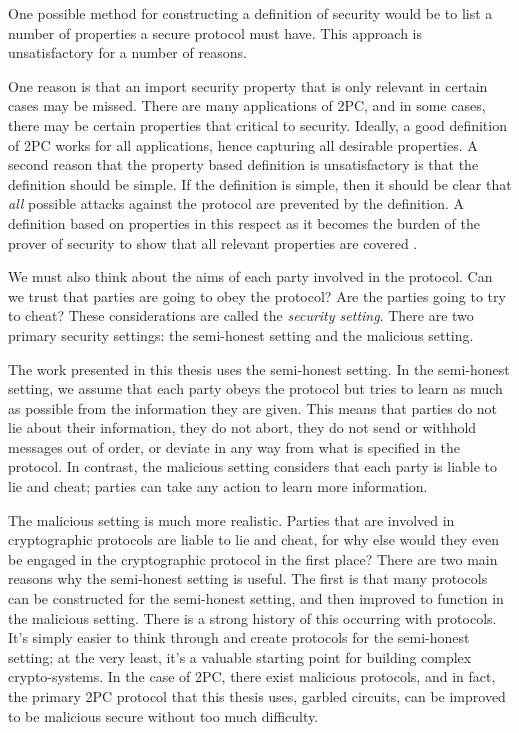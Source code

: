 One possible method for constructing a definition of security would be to list a number of properties a secure protocol must have.
This approach is unsatisfactory for a number of reasons.

One reason is that an import security property that is only relevant in certain cases may be missed.
There are many applications of 2PC, and in some cases, there may be certain properties that critical to security.
Ideally, a good definition of 2PC works for all applications, hence capturing all desirable properties.
A second reason that the property based definition is unsatisfactory is that the definition should be simple.
If the definition is simple, then it should be clear that \textit{all} possible attacks against the protocol are prevented by the definition.
A definition based on properties in this respect as it becomes the burden of the prover of security to show that all relevant properties are covered \cite{lindell2009}.

We must also think about the aims of each party involved in the protocol. 
Can we trust that parties are going to obey the protocol? 
Are the parties going to try to cheat?
These considerations are called the \textit{security setting}.
There are two primary security settings: the semi-honest setting and the malicious setting. 

The work presented in this thesis uses the semi-honest setting. 
In the semi-honest setting, we assume that each party obeys the protocol but tries to learn as much as possible from the information they are given.
This means that parties do not lie about their information, they do not abort, they do not send or withhold messages out of order, or deviate in any way from what is specified in the protocol. 
In contrast, the malicious setting considers that each party is liable to lie and cheat; parties can take any action to learn more information.

The malicious setting is much more realistic. 
Parties that are involved in cryptographic protocols are liable to lie and cheat, for why else would they even be engaged in the cryptographic protocol in the first place?
There are two main reasons why the semi-honest setting is useful.
The first is that many protocols can be constructed for the semi-honest setting, and then improved to function in the malicious setting.
There is a strong history of this occurring with protocols.
It's simply easier to think through and create protocols for the semi-honest setting; at the very least, it's a valuable starting point for building complex crypto-systems.
In the case of 2PC, there exist malicious protocols, and in fact, the primary 2PC protocol that this thesis uses, garbled circuits, can be improved to be malicious secure without too much difficulty. 

